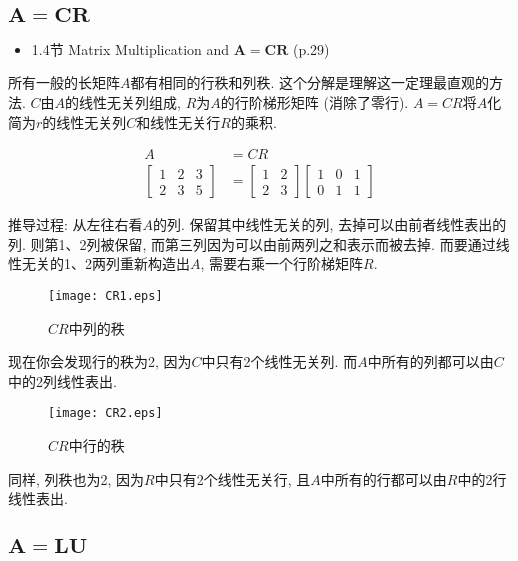 \documentclass[letterpaper]{article}
\begin{document}
\subsection{$\boldsymbol{A=CR}$}

\begin{itemize}
  \item 1.4节 Matrix Multiplication and $\bm{A=CR}$ (p.29)
\end{itemize}

所有一般的长矩阵$A$都有相同的行秩和列秩. 
这个分解是理解这一定理最直观的方法. 
$C$由$A$的线性无关列组成, $R$为$A$的行阶梯形矩阵 (消除了零行).
$A=CR$将$A$化简为$r$的线性无关列$C$和线性无关行$R$的乘积. 

\begin{equation*}
  \begin{split}
    A &= CR\\
  \begin{bmatrix}
    1 & 2 & 3 \\
    2 & 3 & 5
  \end{bmatrix}
  & =
  \begin{bmatrix}
    1 & 2 \\
    2 & 3
  \end{bmatrix}
  \begin{bmatrix}
    1 & 0 & 1 \\
    0 & 1 & 1
  \end{bmatrix}
\end{split}
\end{equation*}

推导过程: 从左往右看$A$的列. 保留其中线性无关的列, 去掉可以由前者线性表出的列. 
则第1、2列被保留, 而第三列因为可以由前两列之和表示而被去掉. 
而要通过线性无关的1、2两列重新构造出$A$, 需要右乘一个行阶梯矩阵$R$. 

\begin{figure}[H]
  \centering
  \texttt{[image: CR1.eps]}
  \caption{$CR$中列的秩}
\end{figure}

现在你会发现行的秩为2, 因为$C$中只有2个线性无关列. 
而$A$中所有的列都可以由$C$中的2列线性表出. 

\begin{figure}[H]
  \centering
  \texttt{[image: CR2.eps]}
  \caption{$CR$中行的秩}
\end{figure}

同样, 列秩也为2, 因为$R$中只有2个线性无关行, 且$A$中所有的行都可以由$R$中的2行线性表出. 

\subsection{$\boldsymbol{A=LU}$}
\end{document}
